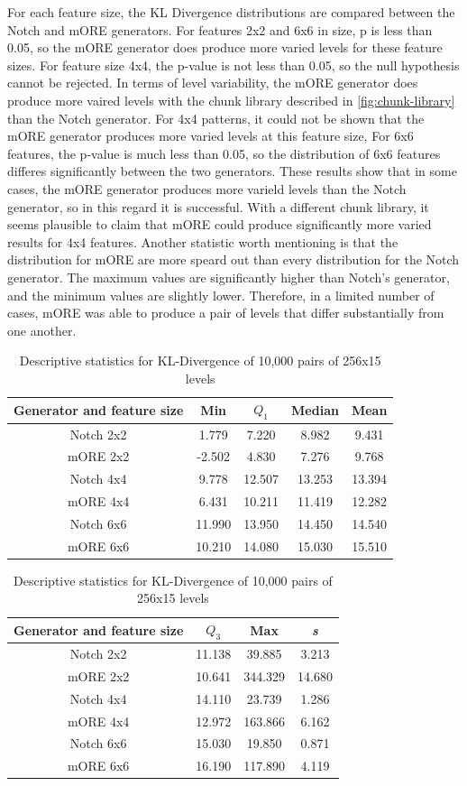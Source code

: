 For each feature size, the KL Divergence distributions are compared between the Notch and 
mORE generators. For features 2x2 and 6x6 in size, p is less than 0.05, so the mORE
generator does produce more varied levels for these feature sizes. For feature size 4x4,
the p-value is not less than 0.05, so the null hypothesis cannot be rejected. In terms of
level variability, the mORE generator does produce more vaired levels with the chunk library
described in \autoref{fig:chunk-library} than the Notch generator. For 4x4 patterns, it could
not be shown that the mORE generator produces more varied levels at this feature size,
For 6x6 features, the p-value is much less than 0.05, so the distribution of 6x6 features
differes significantly between the two generators. These results show that in some cases,
the mORE generator produces more varield levels than the Notch generator, so in this regard
it is successful. With a different chunk library, it seems plausible to claim that mORE could
produce significantly more varied results for 4x4 features. Another statistic worth 
mentioning is that the distribution for mORE are more speard out than every distribution for
the Notch generator. The maximum values are significantly higher than Notch's generator, and
the minimum values are slightly lower. Therefore, in a limited number of cases, mORE was 
able to produce a pair of levels that differ substantially from one another.

\begin{table}[ht]
\begin{tabular}{| c | c | c | c | c |}\hline
Generator and feature size & Min & $Q_1$ & Median & Mean \\\hline
Notch 2x2 & 1.779 & 7.220 & 8.982 & 9.431 \\\hline
mORE 2x2 & -2.502 & 4.830 & 7.276 & 9.768 \\\hline
Notch 4x4 & 9.778 & 12.507 & 13.253 & 13.394 \\\hline
mORE 4x4 & 6.431 & 10.211 & 11.419 & 12.282 \\\hline
Notch 6x6 & 11.990 & 13.950 & 14.450 & 14.540 \\\hline
mORE 6x6 & 10.210 & 14.080 & 15.030 & 15.510 \\\hline
\end{tabular}


\begin{tabular}{| c | c | c | c |}\hline
Generator and feature size & $Q_3$ & Max & \emph{s} \\\hline
Notch 2x2 & 11.138 & 39.885 & 3.213\\\hline
mORE 2x2 & 10.641 & 344.329 & 14.680\\\hline
Notch 4x4 & 14.110 & 23.739 & 1.286\\\hline
mORE 4x4 & 12.972 & 163.866 & 6.162\\\hline
Notch 6x6 & 15.030 & 19.850 & 0.871\\\hline
mORE 6x6 & 16.190 & 117.890 & 4.119\\\hline
\end{tabular}

\caption{Descriptive statistics for KL-Divergence of 10,000 pairs of 256x15 levels}
\label{table:more-ore-desc}
\end{table}


